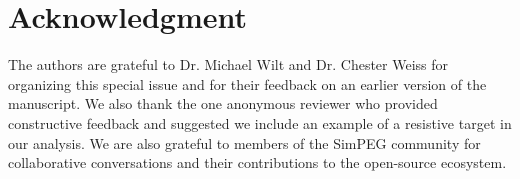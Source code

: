 \documentclass[
    paper
]{geophysics}
\begin{document}
\section{Acknowledgment}

The authors are grateful to Dr. Michael Wilt and Dr. Chester Weiss for organizing this special issue and for their feedback on an earlier version of the manuscript. We also thank the one anonymous reviewer who provided constructive feedback and suggested we include an example of a resistive target in our analysis. We are also grateful to members of the SimPEG community for collaborative conversations and their contributions to the open-source ecosystem.

\clearpage


\end{document}
